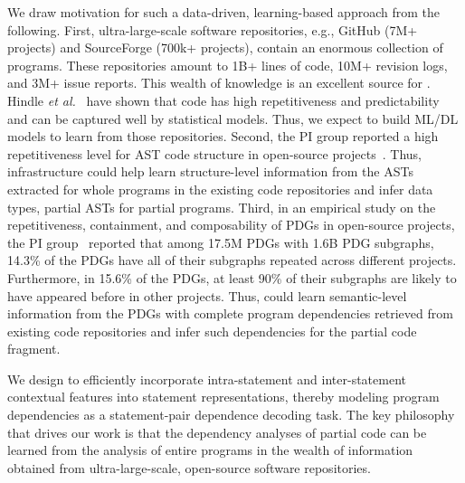 We draw motivation for such a data-driven, learning-based approach from the following. First, ultra-large-scale software repositories, e.g., GitHub (7M+ projects) and SourceForge (700k+ projects), contain an enormous collection of programs. These repositories amount to 1B+ lines of code, 10M+ revision logs, and 3M+ issue reports. This wealth of knowledge is an excellent source for {\tool}. Hindle {\em et al.}~\cite{naturalness-icse12} have shown that code has high repetitiveness and predictability and can be captured well by statistical models. Thus, we expect to build ML/DL models to learn from those repositories. 
Second, the PI group reported a high repetitiveness level for AST code structure in open-source projects~\cite{icse15}. Thus, {\tool} infrastructure could help learn structure-level information from the ASTs extracted for whole programs in the existing code repositories and infer data types, partial ASTs for partial programs. Third, in an empirical study on the repetitiveness, containment, and composability of PDGs in open-source projects, the PI group~\cite{msr16} reported that among 17.5M PDGs with 1.6B PDG subgraphs, 14.3\% of the PDGs have all of their subgraphs repeated across different projects. Furthermore, in 15.6\% of the PDGs, at least 90\% of their subgraphs are likely to have appeared before in other projects. 
Thus, {\tool} could learn semantic-level information from the PDGs
with complete program dependencies retrieved from existing code
repositories and infer such dependencies for the partial code
fragment.


We design {\tool} to efficiently incorporate intra-statement and
inter-statement contextual features into statement representations,
thereby modeling program dependencies as a statement-pair dependence
decoding task. The key philosophy that drives our work is that the
dependency analyses of partial code can be learned from the analysis
of entire programs in the wealth of information obtained from
ultra-large-scale, open-source software repositories.


